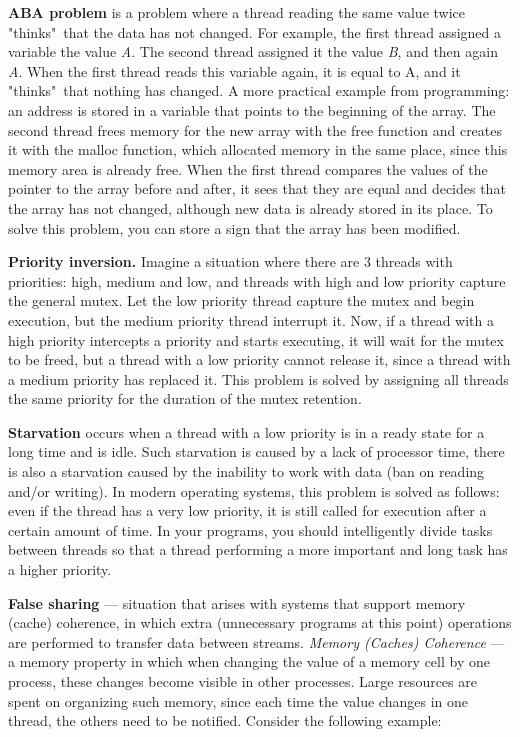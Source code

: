 {	\par\textbf{ABA problem} is a problem where a thread reading the same value twice "thinks"\ that the data has not changed. For example, the first thread assigned a variable the value \textit{A}. The second thread assigned it the value \textit{B}, and then again \textit{A}. When the first thread reads this variable again, it is equal to A, and it "thinks"\ that nothing has changed. A more practical example from programming: an address is stored in a variable that points to the beginning of the array. The second thread frees memory for the new array with the free function and creates it with the malloc function, which allocated memory in the same place, since this memory area is already free. When the first thread compares the values of the pointer to the array before and after, it sees that they are equal and decides that the array has not changed, although new data is already stored in its place. To solve this problem, you can store a sign that the array has been modified.
	\par\textbf{Priority inversion.} Imagine a situation where there are 3 threads with priorities: high, medium and low, and threads with high and low priority capture the general mutex. Let the low priority thread capture the mutex and begin execution, but the medium priority thread interrupt it. Now, if a thread with a high priority intercepts a priority and starts executing, it will wait for the mutex to be freed, but a thread with a low priority cannot release it, since a thread with a medium priority has replaced it. This problem is solved by assigning all threads the same priority for the duration of the mutex retention.
	\par\textbf{Starvation} occurs when a thread with a low priority is in a ready state for a long time and is idle. Such starvation is caused by a lack of processor time, there is also a starvation caused by the inability to work with data (ban on reading and/or writing). In modern operating systems, this problem is solved as follows: even if the thread has a very low priority, it is still called for execution after a certain amount of time. In your programs, you should intelligently divide tasks between threads so that a thread performing a more important and long task has a higher priority.
	\par\textbf{False sharing} ---  situation that arises with systems that support memory (cache) coherence, in which extra (unnecessary programs at this point) operations are performed to transfer data between streams. \textit{Memory (Caches) Coherence} --- a memory property in which when changing the value of a memory cell by one process, these changes become visible in other processes. Large resources are spent on organizing such memory, since each time the value changes in one thread, the others need to be notified. Consider the following example:
}
